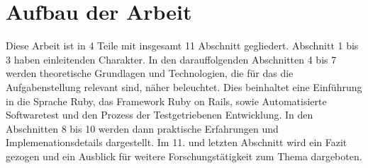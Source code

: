 \section{Aufbau der Arbeit}

Diese Arbeit ist in 4 Teile mit insgesamt 11 Abschnitt gegliedert. Abschnitt 1 bis 3 haben einleitenden Charakter. In den darauffolgenden Abschnitten 4 bis 7 werden theoretische Grundlagen und Technologien, die für das die Aufgabenstellung relevant sind, näher beleuchtet. Dies beinhaltet eine Einführung in die Sprache Ruby, das Framework Ruby on Rails, sowie Automatisierte Softwaretest und den Prozess der Testgetriebenen Entwicklung.
In den Abschnitten 8 bis 10 werden dann praktische Erfahrungen und Implemenationsdetails dargestellt. Im 11. und letzten Abschnitt wird ein Fazit gezogen und ein Ausblick für weitere Forschungstätigkeit zum Thema dargeboten.

